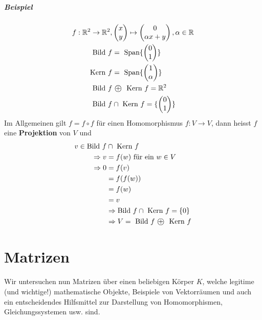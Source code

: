 \documentclass[11pt]{report}
\newcommand*\directsum{%
\text{ \textcircled{+} }
}
\newcommand*\Zb[1] {\mathbb{#1}}
\newcommand*\f[1] {\textbf{#1}}
\begin{document}
\paragraph{Beispiel}
\begin{align}
f: \Zb{R}^2 \rightarrow \Zb{R}^2, &\begin{pmatrix} x \\ y \end{pmatrix} \mapsto \begin{pmatrix} 0 \\ \alpha x + y \end{pmatrix}, \alpha \in \Zb{R} \\
\text{Bild } f &= \text{ Span}\{\begin{pmatrix} 0 \\ 1 \end{pmatrix}\} \\
\text{Kern } f &= \text{ Span}\{\begin{pmatrix} 1 \\ \alpha \end{pmatrix}\} \\
\text{Bild } f &\directsum \text{ Kern } f = \Zb{R}^2 \\
\text{Bild } f &\cap \text{ Kern } f = \{\begin{pmatrix} 0 \\ 1 \end{pmatrix}\}
\end{align}
Im Allgemeinen gilt $f = f \circ f$ für einen Homomorphismus $f: V \rightarrow V$, dann heisst $f$ eine \f{Projektion} von $V$ und
\begin{align}
 v \in \text{Bild } f &\cap \text{ Kern } f \\
\Rightarrow v &= f(w) \text{ für ein } w \in V \\
\Rightarrow 0 &= f(v) \\
&= f(f(w)) \\
&= f(w) \\
&= v \\
&\Rightarrow \text{Bild } f \cap \text{ Kern } f = \{0\} \\
&\Rightarrow V = \text{ Bild } f \directsum \text{ Kern }f
\end{align}

\chapter{Matrizen}
Wir untersuchen nun Matrizen über einen beliebigen Körper $K$, welche legitime (und wichtige!) mathematische Objekte, Beispiele von Vektorräumen und auch ein entscheidendes Hilfsmittel zur Darstellung von Homomorphismen, Gleichungssystemen usw. sind.
\end{document}
